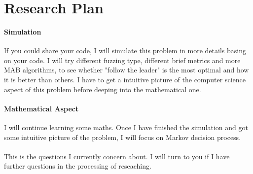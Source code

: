 \section{Research Plan}

\paragraph{Simulation} If you could share your code, I will simulate this problem in more details basing on your code. I will try different
fuzzing type, different brief metrics and more MAB algorithms, to see whether "follow the leader" is the most optimal and how it is better than others. 
I have to get a intuitive picture of the computer science aspect of this problem before deeping into the mathematical one.

\paragraph{Mathematical Aspect} I will continue learning some maths. Once I have finished the simulation and got some intuitive picture of the 
problem, I will focus on Markov decision process.


\paragraph{}This is the questions I currently concern about. I will turn to you if I have further questions in the processing of reseaching.

